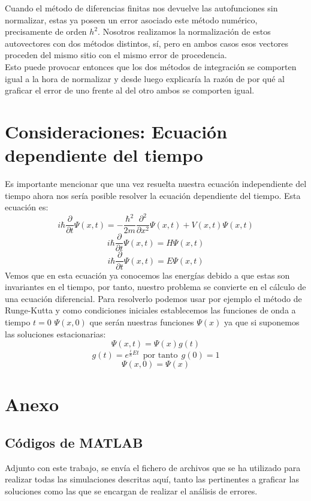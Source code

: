 \documentclass[12pt]{article}
\begin{document}
Cuando el método de diferencias finitas nos devuelve las autofunciones sin normalizar, estas ya poseen un error asociado  este método numérico, precisamente de orden $h^2$. Nosotros realizamos la normalización de estos autovectores con dos métodos distintos, sí, pero en ambos casos esos vectores proceden del mismo sitio con el mismo error de procedencia.\\

Esto puede provocar entonces que los dos métodos de integración se comporten igual a la hora de normalizar y desde luego explicaría la razón de por qué al graficar el error de uno frente al del otro ambos se comporten igual.
    
\section{Consideraciones: Ecuación dependiente del tiempo}

Es importante mencionar que una vez resuelta nuestra ecuación independiente del tiempo ahora nos sería posible resolver la ecuación dependiente del tiempo. Esta ecuación es:
\begin{equation}
    i\hbar \frac{\partial}{\partial t} \Psi(x, t) = -\frac{\hbar^2}{2m} \frac{\partial^2}{\partial x^2} \Psi(x, t) + V(x, t) \Psi(x, t)
\end{equation}
\begin{equation}
    i\hbar \frac{\partial}{\partial t} \Psi(x, t) = H \Psi(x, t)
\end{equation}
\begin{equation}
    i\hbar \frac{\partial}{\partial t} \Psi(x, t) = E \Psi(x, t)
\end{equation}
Vemos que en esta ecuación ya conocemos las energías debido a que estas son invariantes en el tiempo, por tanto, nuestro problema se convierte en el cálculo de una ecuación diferencial.
Para resolverlo podemos usar por ejemplo el método de Runge-Kutta y como condiciones iniciales establecemos las funciones de onda a tiempo $t=0$ $\Psi(x,0)$ que serán nuestras funciones $\Psi(x)$ ya que si suponemos las soluciones estacionarias:
\[
    \Psi(x,t)=\Psi(x)g(t)
    \]
\[
    g(t)=e^{\frac{i}{\hbar}Et} \:\: \text{por tanto}\:\: g(0)=1
\]
\[
    \Psi(x,0)=\Psi(x)
\]




\newpage
\section{Anexo}
\subsection{Códigos de MATLAB}
Adjunto con este trabajo, se envía el fichero de archivos que se ha utilizado para realizar todas las simulaciones descritas aquí, tanto las pertinentes a graficar las soluciones como las que se encargan de realizar el análisis de errores.\\
\end{document}
